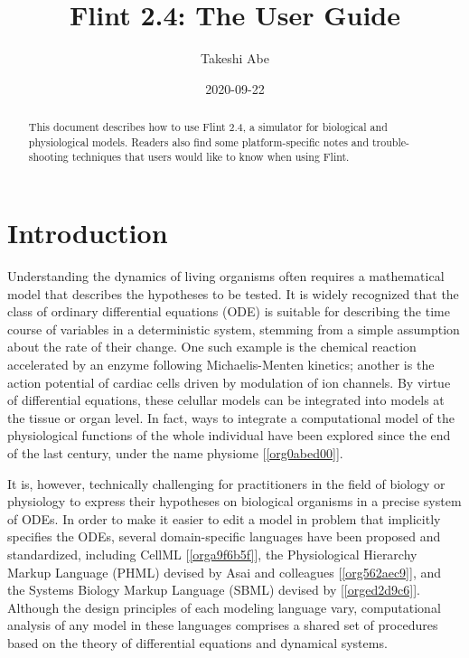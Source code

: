 \documentclass[a4paper,10pt]{report}
\author{Takeshi Abe}
\date{2020-09-22}
\title{Flint 2.4: The User Guide}
\begin{document}
\maketitle
\tableofcontents

\vfill

\doclicenseThis

\begin{abstract}
This document describes how to use Flint 2.4, a simulator for biological and physiological models.
Readers also find some platform-specific notes and trouble-shooting techniques that
users would like to know when using Flint.
\end{abstract}

\chapter{Introduction}
\label{sec:org9d62261}

Understanding the dynamics of living organisms often requires a mathematical model
that describes the hypotheses to be tested. It is widely recognized that the
class of ordinary differential equations (ODE) is suitable for describing the
time course of variables in a deterministic system, stemming from a simple
assumption about the rate of their change.
One such example is the chemical reaction accelerated by an enzyme
following Michaelis-Menten kinetics; another is the action potential of
cardiac cells driven by modulation of ion channels. By virtue of
differential equations, these celullar models can be integrated into models at the
tissue or organ level. In fact, ways to integrate a computational model of
the physiological functions of the whole individual have been explored since the
end of the last century, under the name physiome [\ref{org0abed00}].

It is, however, technically challenging for practitioners in the field of
biology or physiology to express their hypotheses on biological organisms in a
precise system of ODEs. In order to make it easier to edit a model in problem
that implicitly specifies the ODEs, several domain-specific languages have
been proposed and standardized, including CellML [\ref{orga9f6b5f}], the
Physiological Hierarchy Markup Language (PHML) devised by Asai and colleagues
[\ref{org562aec9}], and the Systems Biology Markup Language (SBML) devised
by [\ref{orged2d9c6}]. Although the design principles of each modeling
language vary, computational analysis of any model in these languages
comprises a shared set of procedures based on the theory of differential
equations and dynamical systems.
\end{document}
